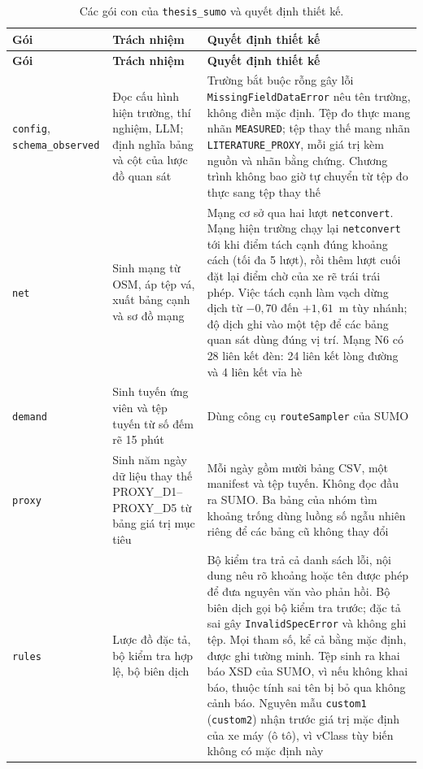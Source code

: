 \documentclass[../main.tex]{subfiles}
\begin{document}
\begingroup\small
\begin{longtable}{|>{\raggedright\arraybackslash}p{2.3cm}|>{\raggedright\arraybackslash}p{4.2cm}|>{\raggedright\arraybackslash}p{7.1cm}|}
\caption{Các gói con của \texttt{thesis\_sumo} và quyết định thiết kế.}\label{table:4.1}\\
\hline
\textbf{Gói} & \textbf{Trách nhiệm} & \textbf{Quyết định thiết kế} \\ \hline
\endfirsthead
\hline
\textbf{Gói} & \textbf{Trách nhiệm} & \textbf{Quyết định thiết kế} \\ \hline
\endhead
\texttt{config}, \texttt{schema\_\allowbreak observed} & Đọc cấu hình hiện trường, thí nghiệm, LLM; định nghĩa bảng và cột của lược đồ quan sát & Trường bắt buộc rỗng gây lỗi \texttt{MissingFieldDataError} nêu tên trường, không điền mặc định. Tệp đo thực mang nhãn \texttt{MEASURED}; tệp thay thế mang nhãn \texttt{LITERATURE\_PROXY}, mỗi giá trị kèm nguồn và nhãn bằng chứng. Chương trình không bao giờ tự chuyển từ tệp đo thực sang tệp thay thế \\ \hline
\texttt{net} & Sinh mạng từ OSM, áp tệp vá, xuất bảng cạnh và sơ đồ mạng & Mạng cơ sở qua hai lượt \texttt{netconvert}. Mạng hiện trường chạy lại \texttt{netconvert} tới khi điểm tách cạnh đúng khoảng cách (tối đa 5 lượt), rồi thêm lượt cuối đặt lại điểm chờ của xe rẽ trái trái phép. Việc tách cạnh làm vạch dừng dịch từ $-0{,}70$ đến $+1{,}61$~m tùy nhánh; độ dịch ghi vào một tệp để các bảng quan sát dùng đúng vị trí. Mạng N6 có 28 liên kết đèn: 24 liên kết lòng đường và 4 liên kết vỉa hè \\ \hline
\texttt{demand} & Sinh tuyến ứng viên và tệp tuyến từ số đếm rẽ 15 phút & Dùng công cụ \texttt{routeSampler} của SUMO \\ \hline
\texttt{proxy} & Sinh năm ngày dữ liệu thay thế PROXY\_D1--PROXY\_D5 từ bảng giá trị mục tiêu & Mỗi ngày gồm mười bảng CSV, một manifest và tệp tuyến. Không đọc đầu ra SUMO. Ba bảng của nhóm tìm khoảng trống dùng luồng số ngẫu nhiên riêng để các bảng cũ không thay đổi \\ \hline
\texttt{rules} & Lược đồ đặc tả, bộ kiểm tra hợp lệ, bộ biên dịch & Bộ kiểm tra trả cả danh sách lỗi, nội dung nêu rõ khoảng hoặc tên được phép để đưa nguyên văn vào phản hồi. Bộ biên dịch gọi bộ kiểm tra trước; đặc tả sai gây \texttt{InvalidSpecError} và không ghi tệp. Mọi tham số, kể cả bằng mặc định, được ghi tường minh. Tệp sinh ra khai báo XSD của SUMO, vì nếu không khai báo, thuộc tính sai tên bị bỏ qua không cảnh báo. Nguyên mẫu \texttt{custom1} (\texttt{custom2}) nhận trước giá trị mặc định của xe máy (ô tô), vì vClass tùy biến không có mặc định này \\ \hline

\end{longtable}
\end{document}
